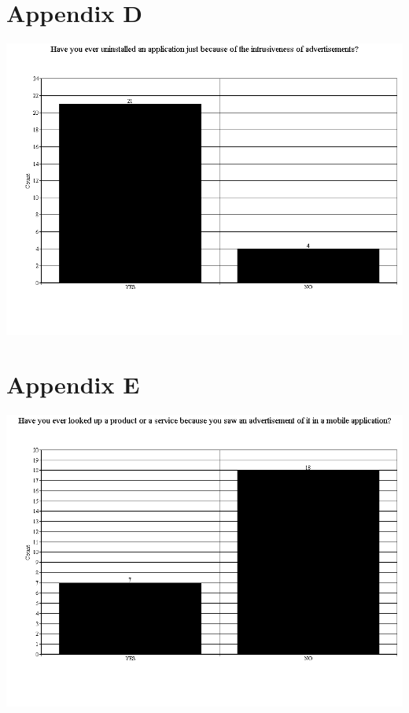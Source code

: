 \section{Appendix D}
\includegraphics[scale=0.5]{Images/q4}
\section{Appendix E}
\includegraphics[scale=0.5]{Images/q5}
